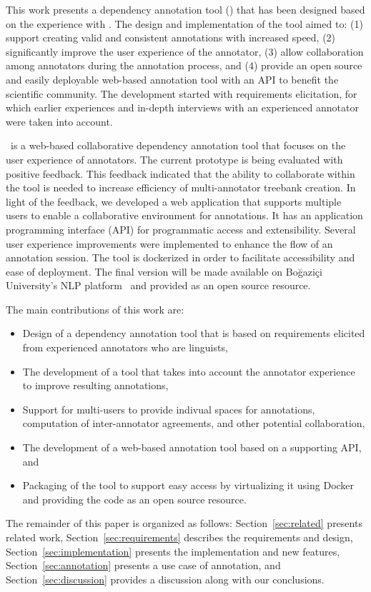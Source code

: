 This work presents a dependency annotation tool (\boatvtwo) that has been designed based on the experience with \boatvone.
The design and implementation of the tool aimed to: (1) support creating valid and consistent annotations with increased speed, (2) significantly improve the user experience of the annotator, (3) allow collaboration among annotators during the annotation process, and (4) provide an open source and easily deployable web-based annotation tool with an API to benefit the scientific community.
The development started with requirements elicitation, for which earlier experiences and in-depth interviews with an experienced annotator were taken into account.

\boatvtwo\ is a web-based collaborative dependency annotation tool that focuses on the user experience of annotators.
The current prototype is being evaluated with positive feedback.
This feedback indicated that the ability to collaborate within the tool is needed to increase efficiency of multi-annotator treebank creation.
In light of the feedback, we developed a web application that supports multiple users to enable a collaborative environment for annotations.
It has an application programming interface (API) for programmatic access and extensibility.
Several user experience improvements were implemented to enhance the flow of an annotation session.
The tool is dockerized in order to facilitate accessibility and ease of deployment.
The final version will be made available on Boğaziçi University's NLP platform~\cite{DIP} and provided as an open source resource.

The main contributions of this work are:
\begin{itemize}
\setlength\itemsep{0em}
        \item Design of a dependency annotation tool that is based on requirements elicited from experienced annotators who are linguists,
        \item The development of a tool that takes into account the annotator experience to improve resulting annotations,
        \item Support for multi-users to provide indivual spaces for annotations, computation of inter-annotator agreements, and other potential collaboration,
        \item The development of a web-based annotation tool based on a supporting API, and
        \item Packaging of the tool to support easy access by virtualizing it using Docker~\cite{docker} and providing the code as an open source resource.
\end{itemize}

The remainder of this paper is organized as follows:
Section~\ref{sec:related} presents related work,
Section~\ref{sec:requirements} describes the requirements and design,
Section~\ref{sec:implementation} presents the implementation and new features,
Section~\ref{sec:annotation} presents a use case of annotation, and 
Section~\ref{sec:discussion} provides a discussion along with our conclusions.
